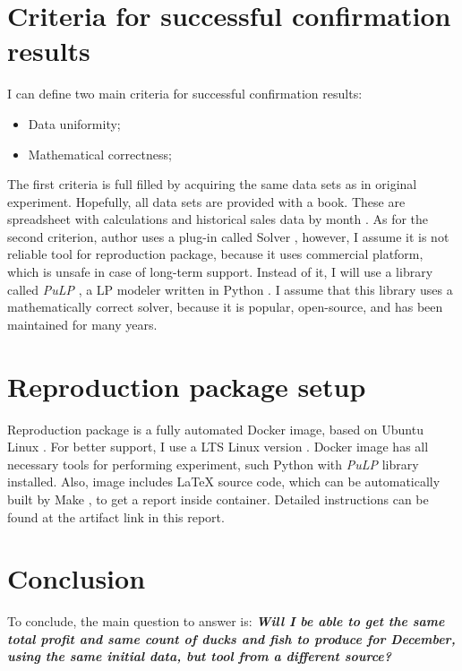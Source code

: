 \documentclass[sigconf, nonacm]{acmart}
\begin{document}
\section{Criteria for successful confirmation results}

I can define two main criteria for successful confirmation results:
\begin{itemize}
    \item Data uniformity;
    \item Mathematical correctness;
\end{itemize}

The first criteria is full filled by acquiring the same data sets as in original experiment. Hopefully, all data sets are provided with a book. These are spreadsheet with calculations \cite{BathingFriendsUnlimited} and historical sales data by month \cite{HistoricalSalesData}. As for the second criterion, author uses a plug-in called Solver \cite{Solver}, however, I assume it is not reliable tool for reproduction package, because it uses commercial platform, which is unsafe in case of long-term support. Instead of it, I will use a library called \textit{PuLP} \cite{PuLP}, a LP modeler written in Python \cite{Python}. I assume that this library uses a mathematically correct solver, because it is popular, open-source, and has been maintained for many years.

\section{Reproduction package setup}
Reproduction package is a fully automated Docker \cite{Docker} image, based on Ubuntu Linux \cite{DockerUbuntu}. For better support, I use a LTS Linux version \cite{LtsReleases}. Docker \cite{Docker} image has all necessary tools for performing experiment, such Python \cite{Python} with \textit{PuLP} \cite{PuLP} library installed. Also, image includes LaTeX \cite{LaTeX} source code, which can be automatically built by Make \cite{Make}, to get a report inside container. Detailed instructions can be found at the artifact link in this report.

\section{Conclusion}

To conclude, the main question to answer is: \textbf{\textit{Will I be able to get the same total profit and same count of ducks and fish to produce for December, using the same initial data, but tool from a different source?}}





\end{document}

